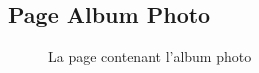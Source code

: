 \documentclass{article}[12pt]
\begin{document}
     \subsection{Page Album Photo}
     \begin{figure}[H]
     	\centering
     	\caption{La page contenant l'album photo}
     \end{figure}
\end{document}
